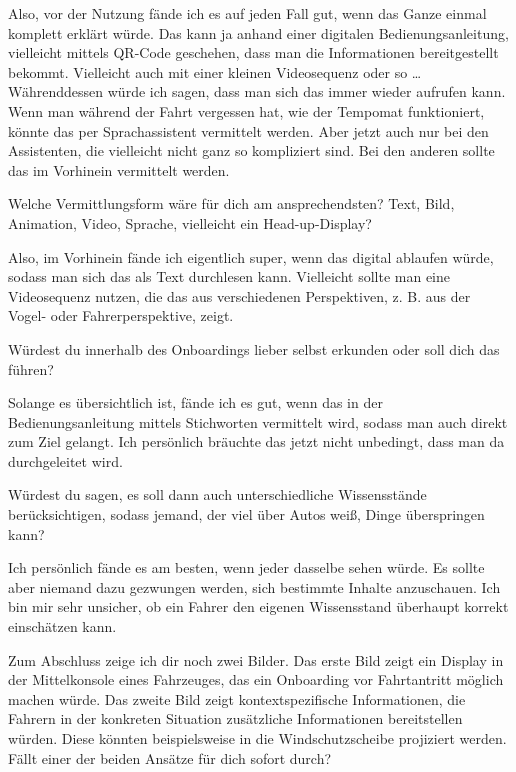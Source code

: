 Also, vor der Nutzung fände ich es auf jeden Fall gut, wenn das Ganze
einmal komplett erklärt würde. Das kann ja anhand einer digitalen
Bedienungsanleitung, vielleicht mittels QR-Code geschehen, dass man die
Informationen bereitgestellt bekommt. Vielleicht auch mit einer kleinen
Videosequenz oder so … Währenddessen würde ich sagen, dass man sich das
immer wieder aufrufen kann. Wenn man während der Fahrt vergessen hat,
wie der Tempomat funktioniert, könnte das per Sprachassistent vermittelt
werden. Aber jetzt auch nur bei den Assistenten, die vielleicht nicht
ganz so kompliziert sind. Bei den anderen sollte das im Vorhinein
vermittelt werden.

\interviewerin
Welche Vermittlungsform wäre für dich am ansprechendsten? Text, Bild,
Animation, Video, Sprache, vielleicht ein Head-up-Display?

Also, im Vorhinein fände ich eigentlich super, wenn das digital ablaufen
würde, sodass man sich das als Text durchlesen kann. Vielleicht sollte
man eine Videosequenz nutzen, die das aus verschiedenen Perspektiven,
z. B. aus der Vogel- oder Fahrerperspektive, zeigt.

\interviewerin
Würdest du innerhalb des Onboardings lieber selbst erkunden oder soll
dich das führen?

Solange es übersichtlich ist, fände ich es gut, wenn das in der
Bedienungsanleitung mittels Stichworten vermittelt wird, sodass man auch
direkt zum Ziel gelangt. Ich persönlich bräuchte das jetzt nicht
unbedingt, dass man da durchgeleitet wird.

\interviewerin
Würdest du sagen, es soll dann auch unterschiedliche Wissensstände
berücksichtigen, sodass jemand, der viel über Autos weiß, Dinge
überspringen kann?

Ich persönlich fände es am besten, wenn jeder dasselbe sehen würde. Es
sollte aber niemand dazu gezwungen werden, sich bestimmte Inhalte
anzuschauen. Ich bin mir sehr unsicher, ob ein Fahrer den eigenen
Wissensstand überhaupt korrekt einschätzen kann.

\interviewerin
Zum Abschluss zeige ich dir noch zwei Bilder. Das erste Bild zeigt ein
Display in der Mittelkonsole eines Fahrzeuges, das ein Onboarding vor
Fahrtantritt möglich machen würde. Das zweite Bild zeigt
kontextspezifische Informationen, die Fahrern in der konkreten Situation
zusätzliche Informationen bereitstellen würden. Diese könnten
beispielsweise in die Windschutzscheibe projiziert werden. Fällt einer
der beiden Ansätze für dich sofort durch?

